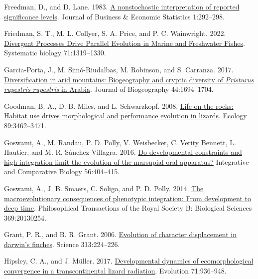 \documentclass[
  11pt,
]{article}
\newlength{\cslhangindent}
\newlength{\cslentryspacingunit} %
\newenvironment{CSLReferences}[2] %
 {%
  \setlength{\parindent}{0pt}
  \ifodd #1
  \let\oldpar\par
  \def\par{\hangindent=\cslhangindent\oldpar}
  \fi
  \setlength{\parskip}{#2\cslentryspacingunit}
 }%
 {}
\begin{document}
\begin{CSLReferences}{1}{0}
\leavevmode{}%
Freedman, D., and D. Lane. 1983.
\href{https://doi.org/10.2307/1391660}{A nonstochastic interpretation of
reported significance levels}. Journal of Business {\&} Economic
Statistics 1:292--298.

\leavevmode{}%
Friedman, S. T., M. L. Collyer, S. A. Price, and P. C. Wainwright. 2022.
\href{https://doi.org/10.1093/sysbio/syab080}{{Divergent Processes Drive
Parallel Evolution in Marine and Freshwater Fishes}}. Systematic biology
71:1319--1330.

\leavevmode{}%
Garcia-Porta, J., M. Simó-Riudalbas, M. Robinson, and S. Carranza. 2017.
\href{https://doi.org/10.1111/jbi.12929}{Diversification in arid
mountains: Biogeography and cryptic diversity of \emph{{P}risturus
rupestris rupestris} in {A}rabia}. Journal of Biogeography
44:1694--1704.

\leavevmode{}%
Goodman, B. A., D. B. Miles, and L. Schwarzkopf. 2008.
\href{https://doi.org/10.1890/07-2093.1}{{Life on the rocks: Habitat use
drives morphological and performance evolution in lizards}}. Ecology
89:3462--3471.

\leavevmode{}%
Goswami, A., M. Randau, P. D. Polly, V. Weisbecker, C. Verity Bennett,
L. Hautier, and M. R. Sánchez-Villagra. 2016.
\href{https://doi.org/10.1093/icb/icw039}{Do developmental constraints
and high integration limit the evolution of the marsupial oral
apparatus?} Integrative and Comparative Biology 56:404--415.

\leavevmode{}%
Goswami, A., J. B. Smaers, C. Soligo, and P. D. Polly. 2014.
\href{https://doi.org/10.1098/rstb.2013.0254}{The macroevolutionary
consequences of phenotypic integration: From development to deep time}.
Philosophical Transactions of the Royal Society B: Biological Sciences
369:20130254.

\leavevmode{}%
Grant, P. R., and B. R. Grant. 2006.
\href{https://doi.org/10.1126/science.1128374}{Evolution of character
displacement in darwin's finches}. Science 313:224--226.

\leavevmode{}%
Hipsley, C. A., and J. Müller. 2017.
\href{https://doi.org/10.1111/evo.13186}{{Developmental dynamics of
ecomorphological convergence in a transcontinental lizard radiation}}.
Evolution 71:936--948.


\end{CSLReferences}
\end{document}

